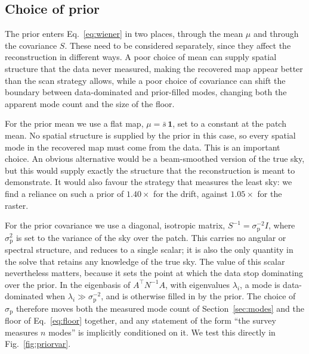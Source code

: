 \documentclass[a4paper,fleqn,usenatbib]{mnras}
\begin{document}
\subsection{Choice of prior}
\label{sec:prior}

The prior enters Eq.~\eqref{eq:wiener} in two places, through the mean $\mu$
and through the covariance $S$. These need to be considered separately, since
they affect the reconstruction in different ways. A poor choice of mean can
supply spatial structure that the data never measured, making the recovered
map appear better than the scan strategy allows, while a poor choice of
covariance can shift the boundary between data-dominated and prior-filled
modes, changing both the apparent mode count and the size of the floor.

For the prior mean we use a flat map, $\mu = \bar{s}\,\mathbf{1}$, set to a
constant at the patch mean. No spatial structure is supplied by the prior in
this case, so every spatial mode in the recovered map must come from the data.
This is an important choice. An obvious alternative would be a beam-smoothed
version of the true sky, but this would supply exactly the structure that the
reconstruction is meant to demonstrate. It would also favour the strategy that
measures the least sky: we find a reliance on such a prior of $1.40\times$ for
the drift, against $1.05\times$ for the raster.

For the prior covariance we use a diagonal, isotropic matrix,
$S^{-1} = \sigma_{\mathrm{p}}^{-2} I$, where $\sigma_{\mathrm{p}}^{2}$ is set to
the variance of the sky over the patch. This carries no angular or spectral
structure, and reduces to a single scalar; it is also the only quantity in
the solve that retains any knowledge of the true sky. The value of this scalar
nevertheless matters, because it sets the point at which the data stop
dominating over the prior. In the eigenbasis of $A^{\top}N^{-1}A$, with
eigenvalues $\lambda_i$, a mode is data-dominated when
$\lambda_i \gg \sigma_{\mathrm{p}}^{-2}$, and is otherwise filled in by the
prior. The choice of $\sigma_{\mathrm{p}}$ therefore moves both the measured
mode count of Section~\ref{sec:modes} and the floor of Eq.~\eqref{eq:floor}
together, and any statement of the form ``the survey measures $n$ modes'' is
implicitly conditioned on it. We test this directly in
Fig.~\ref{fig:priorvar}.
\end{document}
